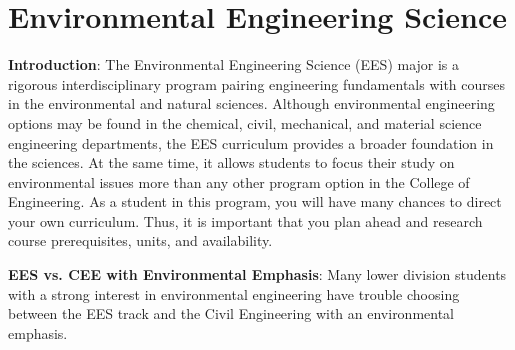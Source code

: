 \chapter*{Environmental Engineering Science}

\textbf{Introduction}: The Environmental Engineering Science (EES) major is a rigorous interdisciplinary program pairing engineering fundamentals with courses in the environmental and natural sciences. Although environmental engineering options may be found in the chemical, civil, mechanical, and material science engineering departments, the EES curriculum provides a broader foundation in the sciences. At the same time, it allows students to focus their study on environmental issues more than any other program option in the College of Engineering. As a student in this program, you will have many chances to direct your own curriculum. Thus, it is important that you plan ahead and research course prerequisites, units, and availability.

\textbf{EES vs. CEE with Environmental Emphasis}: Many lower division students with a strong interest in environmental engineering have trouble choosing between the EES track and the Civil Engineering with an environmental emphasis.


